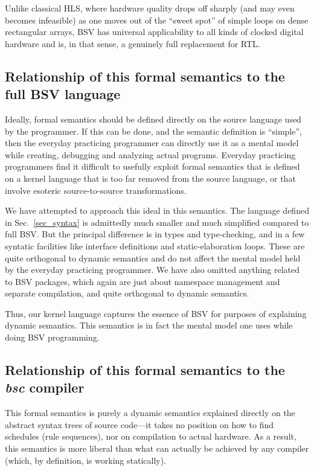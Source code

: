 \documentclass[11pt]{article}
\begin{document}
Unlike classical HLS, where hardware quality drops off sharply (and
may even becomes infeasible) as one moves out of the ``sweet spot'' of
simple loops on dense rectangular arrays, BSV has universal
applicability to all kinds of clocked digital hardware and is, in that
sense, a genuinely full replacement for RTL.


\subsection{Relationship of this formal semantics to the full BSV language}

Ideally, formal semantics should be defined directly on the source
language used by the programmer.  If this can be done, and the
semantic definition is ``simple'', then the everyday practicing
programmer can directly use it as a mental model while creating,
debugging and analyzing actual programs.  Everyday practicing
programmers find it difficult to usefully exploit formal semantics
that is defined on a kernel language that is too far removed from the
source language, or that involve esoteric source-to-source
transformations.

We have attempted to approach this ideal in this semantics.  The
language defined in Sec.~\ref{sec_syntax} is admittedly much smaller
and much simplified compared to full BSV.  But the principal
difference is in types and type-checking, and in a few syntatic
facilities like interface definitions and static-elaboration loops.
These are quite orthogonal to dynamic semantics and do not affect the
mental model held by the everyday practicing programmer.  We have also
omitted anything related to BSV packages, which again are just about
namespace management and separate compilation, and quite orthogonal to
dynamic semantics.

Thus, our kernel language captures the essence of BSV for purposes of
explaining dynamic semantics.  This semantics is in fact the mental
model one uses while doing BSV programming.


\subsection{Relationship of this formal semantics to the {\it bsc} compiler}

This formal semantics is purely a dynamic semantics explained directly
on the abstract syntax trees of source code---it takes no position on
how to find schedules (rule sequences), nor on compilation to actual
hardware.  As a result, this semantics is more liberal than what can
actually be achieved by any compiler (which, by definition, is working
statically).
\end{document}
